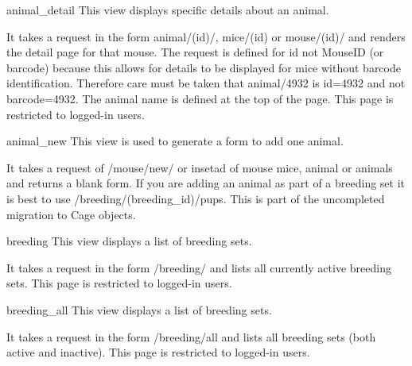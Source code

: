 \documentclass[letterpaper,10pt,english]{sphinxmanual}
\begin{document}
\hypertarget{animal.views.animal\_detail}{}\begin{memberdesc}{animal\_detail}
This view displays specific details about an animal.

It takes a request in the form animal/(id)/, mice/(id) or mouse/(id)/ and renders the detail page for that mouse.  The request is defined for id not MouseID (or barcode) because this allows for details to be displayed for mice without barcode identification.
Therefore care must be taken that animal/4932 is id=4932 and not barcode=4932.  The animal name is defined at the top of the page.
This page is restricted to logged-in users.
\end{memberdesc}

\hypertarget{animal.views.animal\_new}{}\begin{memberdesc}{animal\_new}
This view is used to generate a form to add one animal.

It takes a request of /mouse/new/ or insetad of mouse mice, animal or animals and returns a blank form.
If you are adding an animal as part of a breeding set it is best to use /breeding/(breeding\_id)/pups.  This is part of the uncompleted migration to Cage objects.
\end{memberdesc}

\hypertarget{animal.views.breeding}{}\begin{memberdesc}{breeding}
This view displays a list of breeding sets.

It takes a request in the form /breeding/ and lists all currently active breeding sets.
This page is restricted to logged-in users.
\end{memberdesc}

\hypertarget{animal.views.breeding\_all}{}\begin{memberdesc}{breeding\_all}
This view displays a list of breeding sets.

It takes a request in the form /breeding/all and lists all breeding sets (both active and inactive).
This page is restricted to logged-in users.
\end{memberdesc}
\end{document}
